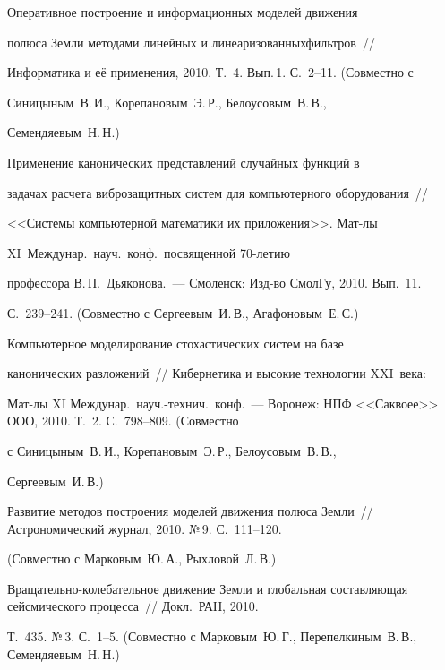 Оперативное построение и информационных моделей движения


полюса Земли методами линейных и линеаризованных\linebreak фильт\-ров~//


Информатика и её применения, 2010. Т.~4. Вып.\,1. С.~2--11. (Совместно с


Синицыным~В.\,И., Корепановым~Э.\,Р., Белоусовым~В.\,В.,


Семендяевым~Н.\,Н.)





 Применение канонических представлений случайных функций в


задачах расчета виброзащитных систем для компьютерного оборудования~//


<<Системы компьютерной математики их приложения>>. Мат-лы


XI~Междунар.\ науч.\ конф.\, посвященной 70-ле\-тию


профессора В.\,П.~Дьяконова.~--- Смоленск: Изд-во СмолГу, 2010. Вып.~11.


С.~239--241. (Совместно с Сер\-ге\-евым~И.\,В., Агафоновым~Е.\,С.)





 Компьютерное моделирование стохастических систем на базе


канонических разложений~// Кибернетика и высокие технологии XXI~века:


Мат-лы XI Междунар.\ науч.-технич.\ конф.~--- Воронеж: НПФ <<Саквоее>> ООО, 2010. Т.~2. С.~798--809. (Совместно


с Синицыным~В.\,И., Корепановым~Э.\,Р., Белоусовым~В.\,В.,


Сергеевым~И.\,В.)





Развитие методов построения моделей движения полюса Зем\-ли~// Астрономический журнал, 2010. №\,9. С.~111--120.


(Совместно с Марковым~Ю.\,А., Рыхловой~Л.\,В.)





Вращательно-колебательное движение Земли и глобальная составляющая сейсмического процесса~// Докл.\ РАН, 2010.\linebreak


Т.~435. №\,3. С.~1--5. (Совместно с Марковым~Ю.\,Г., Перепелкиным~В.\,В., Семендяевым~Н.\,Н.)





